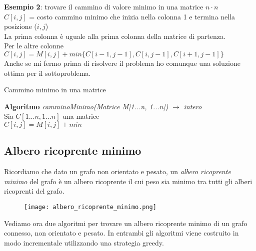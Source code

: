 \textbf{Esempio 2}: trovare il cammino di valore minimo in una matrice $n \cdot n$\\
$C[i,j]$ = costo cammino minimo che inizia nella colonna 1 e termina nella posizione ($i, j$)\\
La prima colonna è uguale alla prima colonna della matrice di partenza.\\
Per le altre colonne $C[i, j] = M[i,j] + min\lbrace C[i-1, j-1], C[i, j-1], C[i+1, j-1]\rbrace$\\
Anche se mi fermo prima di risolvere il problema ho comunque una soluzione ottima per il
sottoproblema.
\begin{algorithm}
    \caption{Cammino minimo in una matrice}
    \Indm\textbf{Algoritmo} \emph{camminoMinimo(Matrice M[1...n, 1...n])} $\rightarrow$ \emph{intero}\\
    \Indp Sia $C[1...n, 1...n]$ una matrice\\
    $C[i,j] = M[i,j] + min$\\
\end{algorithm}

\clearpage


\subsection{Albero ricoprente minimo}
Ricordiamo che dato un grafo non orientato e pesato, un \emph{albero ricoprente minimo} del grafo è un albero ricoprente
il cui peso sia minimo tra tutti gli alberi ricoprenti del grafo.
\begin{figure}[h]
    \texttt{[image: albero\_ricoprente\_minimo.png]}
\end{figure}
Vediamo ora due algoritmi per trovare un albero ricoprente minimo di un grafo connesso, non orientato
e pesato. In entrambi gli algoritmi viene costruito in modo incrementale utilizzando una strategia greedy.
\clearpage
